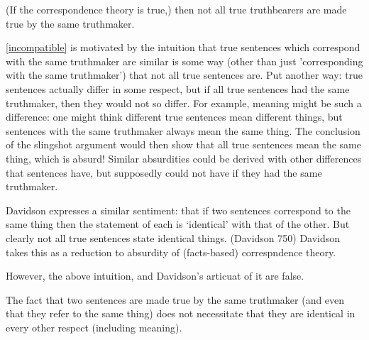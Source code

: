 

	\begin{thesis} \label{incompatible}
	(If the correspondence theory is true,) then not all true truthbearers are made true by the same truthmaker.
	\end{thesis}

\ref{incompatible} is motivated by the intuition that true sentences which correspond with the same truthmaker are similar is some way (other than just 'corresponding with the same truthmaker') that not all true sentences are.
Put another way: true sentences actually differ in some respect, but if all true sentences had the same truthmaker, then they would not so differ.
For example, meaning might be such a difference: one might think different true sentences mean different things, but sentences with the same truthmaker always mean the same thing.
The conclusion of the slingshot argument would then show that all true sentences mean the same thing, which is absurd!
Similar absurdities could be derived with other differences that sentences have, but supposedly could not have if they had the same truthmaker.

Davidson expresses a similar sentiment: that if two sentences correspond to the same thing then the statement of each is `identical' with that of the other.
But clearly not all true sentences state identical things.
(Davidson 750)
Davidson takes this as a reduction to absurdity of (facts-based) correspndence theory.  %


However, the above intuition, and Davidson's articuat of it are false.

The fact that two sentences are made true by the same truthmaker (and even that they refer to the same thing) does not necessitate that they are identical in every other respect (including meaning).


